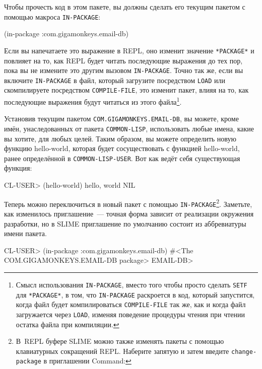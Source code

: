 Чтобы прочесть код в этом пакете, вы должны сделать его текущим пакетом с помощью макроса
\lstinline{IN-PACKAGE}:

\begin{myverb}
(in-package :com.gigamonkeys.email-db)
\end{myverb}

Если вы напечатаете это выражение в REPL, оно изменит значение \lstinline{*PACKAGE*} и повлияет
на то, как REPL будет читать последующие выражения до тех пор, пока вы не измените это
другим вызовом \lstinline{IN-PACKAGE}. Точно так же, если вы включите \lstinline{IN-PACKAGE} в файл,
который загрузите посредством \lstinline{LOAD} или скомпилируете посредством
\lstinline{COMPILE-FILE}, это изменит пакет, влияя на то, как последующие выражения будут
читаться из этого файла\footnote{Смысл использования \lstinline{IN-PACKAGE}, вместо того
  чтобы просто сделать \lstinline{SETF} для \lstinline{*PACKAGE*}, в том, что \lstinline{IN-PACKAGE}
  раскроется в код, который запустится, когда файл будет компилироваться
  \lstinline{COMPILE-FILE} так же, как и когда файл загружается через \lstinline{LOAD}, изменяя поведение
  процедуры чтения при чтении остатка файла при компиляции.}\hspace{\footnotenegspace}.

Установив текущим пакетом \lstinline{COM.GIGAMONKEYS.EMAIL-DB}, вы можете, кроме имён,
унаследованных от пакета \lstinline{COMMON-LISP}, использовать любые имена, какие вы хотите,
для любых целей. Таким образом, вы можете определить новую функцию hello-world, которая
будет сосуществовать с функцией hello-world, ранее определённой в
\lstinline{COMMON-LISP-USER}. Вот как ведёт себя существующая функция:

\begin{myverb}
CL-USER> (hello-world)
hello, world
NIL
\end{myverb}

Теперь можно переключиться в новый пакет с помощью \lstinline{IN-PACKAGE}\footnote{В~REPL
буфере SLIME можно также изменять пакеты с помощью клавиатурных сокращений REPL. Наберите
запятую и затем введите \lstinline{change-package} в приглашении Command:}. Заметьте, как изменилось
приглашение~--- точная форма зависит от реализации окружения разработки, но в SLIME
приглашение по умолчанию состоит из аббревиатуры имени пакета.

\begin{myverb}
CL-USER> (in-package :com.gigamonkeys.email-db)
#<The COM.GIGAMONKEYS.EMAIL-DB package>
EMAIL-DB> 
\end{myverb}


